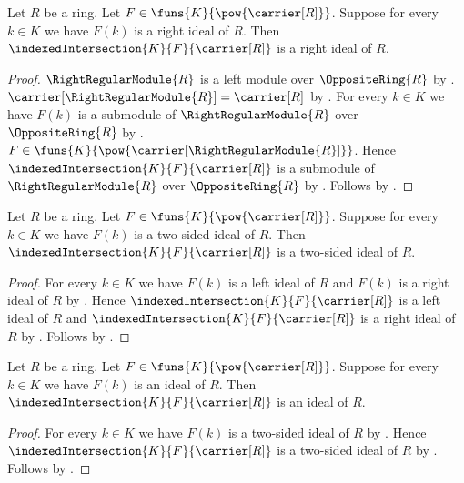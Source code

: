 \begin{theorem}\label{right_ideal_indexed_intersection}
    Let $R$ be a ring.
    Let $F\in\funs{K}{\pow{\carrier[R]}}$.
    Suppose for every $k\in K$ we have $F(k)$ is a right ideal of $R$.
    Then $\indexedIntersection{K}{F}{\carrier[R]}$
        is a right ideal of $R$.
\end{theorem}
\begin{proof}
    $\RightRegularModule{R}$ is a left module over
        $\OppositeRing{R}$ by
        .
    $\carrier[\RightRegularModule{R}]=\carrier[R]$ by
        .
    For every $k\in K$ we have
        $F(k)$ is a submodule of $\RightRegularModule{R}$ over
            $\OppositeRing{R}$ by
        .
    $F\in\funs{K}{\pow{\carrier[\RightRegularModule{R}]}}$.
    Hence $\indexedIntersection{K}{F}{\carrier[R]}$
        is a submodule of $\RightRegularModule{R}$ over
            $\OppositeRing{R}$ by
        .
    Follows by .
\end{proof}

\begin{theorem}\label{two_sided_ideal_indexed_intersection}
    Let $R$ be a ring.
    Let $F\in\funs{K}{\pow{\carrier[R]}}$.
    Suppose for every $k\in K$ we have
        $F(k)$ is a two-sided ideal of $R$.
    Then $\indexedIntersection{K}{F}{\carrier[R]}$
        is a two-sided ideal of $R$.
\end{theorem}
\begin{proof}
    For every $k\in K$ we have $F(k)$ is a left ideal of $R$ and
        $F(k)$ is a right ideal of $R$ by .
    Hence $\indexedIntersection{K}{F}{\carrier[R]}$
        is a left ideal of $R$ and
        $\indexedIntersection{K}{F}{\carrier[R]}$
        is a right ideal of $R$ by
        .
    Follows by .
\end{proof}

\begin{corollary}\label{ideal_indexed_intersection}
    Let $R$ be a ring.
    Let $F\in\funs{K}{\pow{\carrier[R]}}$.
    Suppose for every $k\in K$ we have $F(k)$ is an ideal of $R$.
    Then $\indexedIntersection{K}{F}{\carrier[R]}$ is an ideal of $R$.
\end{corollary}
\begin{proof}
    For every $k\in K$ we have $F(k)$ is a two-sided ideal of $R$ by
        .
    Hence $\indexedIntersection{K}{F}{\carrier[R]}$
        is a two-sided ideal of $R$ by
        .
    Follows by .
\end{proof}

